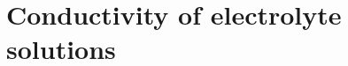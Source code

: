 \documentclass{book}
\begin{document}
 

 
\newcommand\chapterlabel{}\newcommand\ChapterNameLabel{}\newcommand\labname{}\newcommand\chapterpathtocontent{}\newcommand\chapterpathtoimages{}\newcommand\chapterpath{} 

\section{Conductivity of electrolyte solutions}
\renewcommand\chapterlabel{Ch-solutions}\renewcommand\ChapterNameLabel{\chapterlabel}\renewcommand\labname{conductivity}\renewcommand\chapterpathtocontent{../../}\renewcommand\chapterpathtoimages{\chapterpathtocontent}\renewcommand\chapterpath{../../\chapterlabel/LAB-\labname/}
\end{document}
